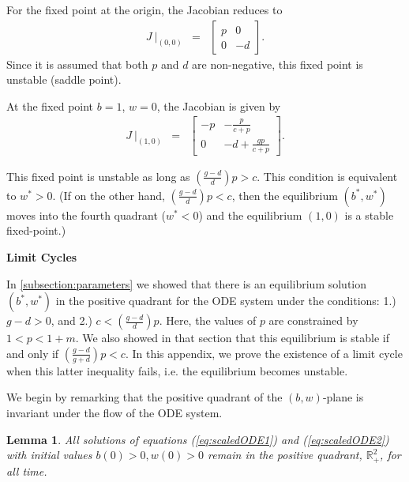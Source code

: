 \documentclass[review,authoryear]{elsarticle}
\newtheorem{lemma}[theorem]{Lemma}
\begin{document}
For the fixed point at the origin, the Jacobian reduces to 
\begin{eqnarray*}
  J~\bigg|_{(0,0)} & = & \left[
          \begin{array}{rr}
            p & 0 \\
            0 & -d
          \end{array}
          \right].
\end{eqnarray*}
Since it is assumed that both $p$ and $d$ are non-negative, this fixed point  is unstable  (saddle point).



At the fixed point $b=1$, $w=0$, the Jacobian is given by 
\begin{eqnarray*}
  J~\bigg|_{(1,0)} & = & \left[
          \begin{array}{cc}
            -p & -\frac{p}{c+p} \\
            0 & -d+\frac{gp}{c+p}
          \end{array}
          \right].
\end{eqnarray*}

This fixed point is unstable as long as $\left( \frac{g-d}{d}\right)p >c$.  This condition is equivalent to $w^*>0$.  (If on the other hand, $\left( \frac{g-d}{d}\right)p <c$, then the equilibrium $(b^*,w^*)$ moves into the fourth quadrant ($w^*<0$) and the equilibrium $(1,0)$ is a stable fixed-point.)


\noindent
\textbf{Limit Cycles}

In \ref{subsection:parameters} we showed that there is an equilibrium solution $(b^*,w^*)$ in the positive quadrant for the ODE system under the conditions:  1.)  $g-d>0$, and 2.) $c<\left( \frac{g-d}{d}\right)p$.   Here, the values of  $p$ are constrained by $1<p<1+m$.   We also showed in that section that this 
equilibrium is stable if and only if $\left( \frac{g-d}{g+d}\right)p < c.$   In this appendix, we prove the existence of a limit cycle when this latter inequality fails, i.e. the equilibrium becomes unstable.

We begin by remarking that the positive quadrant of the $(b,w)$-plane is invariant under the flow of the ODE system.

\begin{lemma}


All solutions of equations (\ref{eq:scaledODE1}) and
  (\ref{eq:scaledODE2}) with initial values
  $b\left( 0\right) > 0 ,w\left( 0\right) >0$ remain in the positive quadrant, $\mathbb R_+^2$, for all time.
\end{lemma}
\end{document}
